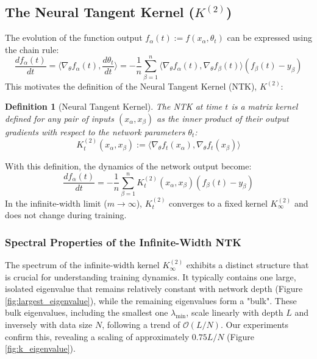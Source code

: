 \documentclass{article}
\newtheorem{definition}[theorem]{Definition}
\newcommand{\Ktwo}{K^{(2)}}
\newcommand{\Order}{\mathcal{O}}
\begin{document}
\subsection{The Neural Tangent Kernel ($K^{(2)}$)}
The evolution of the function output $f_\alpha(t) := f(x_\alpha, \theta_t)$ can be expressed using the chain rule:
\begin{equation}
\frac{d f_\alpha(t)}{dt} = \langle \nabla_\theta f_\alpha(t), \frac{d\theta_t}{dt} \rangle = -\frac{1}{n} \sum_{\beta=1}^n \langle \nabla_\theta f_\alpha(t), \nabla_\theta f_\beta(t) \rangle (f_\beta(t) - y_\beta)
\end{equation}
This motivates the definition of the Neural Tangent Kernel (NTK), $K^{(2)}$:
\begin{definition}[Neural Tangent Kernel]
The NTK at time $t$ is a matrix kernel defined for any pair of inputs $(x_\alpha, x_\beta)$ as the inner product of their output gradients with respect to the network parameters $\theta_t$:
\begin{equation}
K^{(2)}_t(x_\alpha, x_\beta) := \langle \nabla_\theta f_t(x_\alpha), \nabla_\theta f_t(x_\beta) \rangle
\end{equation}
\end{definition}
With this definition, the dynamics of the network output become:
\begin{equation}
\frac{d f_\alpha(t)}{dt} = -\frac{1}{n} \sum_{\beta=1}^n K^{(2)}_t(x_\alpha, x_\beta) (f_\beta(t) - y_\beta)
\end{equation}
In the infinite-width limit ($m \to \infty$), $K^{(2)}_t$ converges to a fixed kernel $K^{(2)}_\infty$ and does not change during training.

\subsubsection{Spectral Properties of the Infinite-Width NTK}
The spectrum of the infinite-width kernel $\Ktwo_\infty$ exhibits a distinct structure that is crucial for understanding training dynamics. It typically contains one large, isolated eigenvalue that remains relatively constant with network depth (Figure \ref{fig:largest_eigenvalue}), while the remaining eigenvalues form a "bulk". These bulk eigenvalues, including the smallest one $\lambda_{\min}$, scale linearly with depth $L$ and inversely with data size $N$, following a trend of $\Order(L/N)$. Our experiments confirm this, revealing a scaling of approximately $0.75 L/N$ (Figure \ref{fig:k_eigenvalue}).
\end{document}
